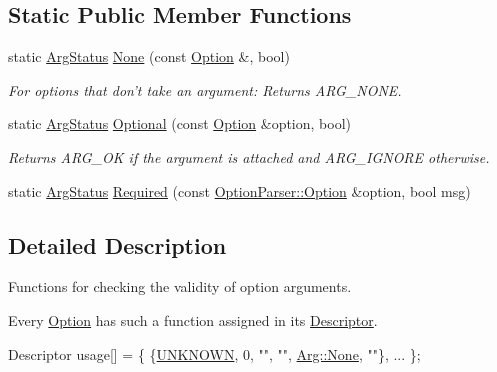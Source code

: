\subsection*{Static Public Member Functions}
\begin{DoxyCompactItemize}
\item 
static \hyperlink{namespace_option_parser_ad237d47d58c66dea8dcf4f53ac11a6e4}{Arg\-Status} \hyperlink{struct_option_parser_1_1_arg_afd9e5e7362e4accc619fe7dee7098956}{None} (const \hyperlink{class_option_parser_1_1_option}{Option} \&, bool)
\begin{DoxyCompactList}\small\item\em For options that don't take an argument\-: Returns A\-R\-G\-\_\-\-N\-O\-N\-E. \end{DoxyCompactList}\item 
static \hyperlink{namespace_option_parser_ad237d47d58c66dea8dcf4f53ac11a6e4}{Arg\-Status} \hyperlink{struct_option_parser_1_1_arg_a3fcea82be66b4aff1971cbab6deabdf1}{Optional} (const \hyperlink{class_option_parser_1_1_option}{Option} \&option, bool)
\begin{DoxyCompactList}\small\item\em Returns A\-R\-G\-\_\-\-O\-K if the argument is attached and A\-R\-G\-\_\-\-I\-G\-N\-O\-R\-E otherwise. \end{DoxyCompactList}\item 
static \hyperlink{namespace_option_parser_ad237d47d58c66dea8dcf4f53ac11a6e4}{Arg\-Status} \hyperlink{struct_option_parser_1_1_arg_a499af2667b09f9f7f9fa9547dcd36e59}{Required} (const \hyperlink{class_option_parser_1_1_option}{Option\-Parser\-::\-Option} \&option, bool msg)
\end{DoxyCompactItemize}


\subsection{Detailed Description}
Functions for checking the validity of option arguments. 

Every \hyperlink{class_option_parser_1_1_option}{Option} has such a function assigned in its \hyperlink{struct_option_parser_1_1_descriptor}{Descriptor}. 
\begin{DoxyCode}
Descriptor usage[] = \{ \{\hyperlink{_community_detection_8cpp_a0ba79095c558cb72ea2e8b277be1da39a6ce26a62afab55d7606ad4e92428b30c}{UNKNOWN}, 0, \textcolor{stringliteral}{""}, \textcolor{stringliteral}{""}, \hyperlink{struct_option_parser_1_1_arg_afd9e5e7362e4accc619fe7dee7098956}{Arg::None}, \textcolor{stringliteral}{""}\}, ...
       \};
\end{DoxyCode}



